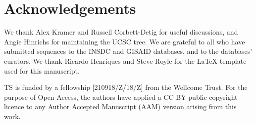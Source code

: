 \section*{Acknowledgements}
We thank Alex Kramer and Russell Corbett-Detig for useful discussions, and Angie Hinrichs for maintaining the UCSC tree.  We are grateful to all who have submitted sequences to the INSDC and GISAID databases, and to the databases' curators. We thank Ricardo Henriques and Steve Royle for the LaTeX template used for this manuscript.

TS is funded by a fellowship [210918/Z/18/Z] from the Wellcome Trust. For the purpose of Open Access,
the authors have applied a CC BY public copyright licence
to any Author Accepted Manuscript (AAM) version arising
from this work.